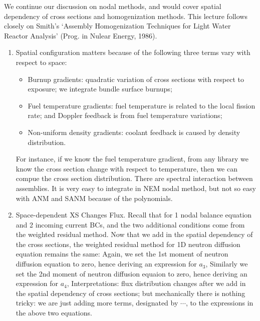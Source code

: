 \documentclass{school-22.211-notes}
\date{May  7, 2012}
\begin{document}
\maketitle

 \label{homogenization}
We continue our discussion on nodal methods, and would cover spatial dependency of cross sections and homogenization methods. This lecture follows closely on Smith's `Assembly Homogenization Techniques for Light Water Reactor Analysis' (Prog. in Nulear Energy, 1986). 




\begin{enumerate}
\item Spatial configuration matters because of the following three terms vary with respect to space:
\begin{itemize}
\item Burnup gradients: quadratic variation of cross sections with respect to exposure; we integrate bundle surface burnups;
\item Fuel temperature gradients: fuel temperature is related to the local fission rate; and Doppler feedback is from fuel temperature variations;
\item Non-uniform density gradients: coolant feedback is caused by density distribution.
\end{itemize}
For instance, if we know the fuel temperature gradient, from any library we know the cross section change with respect to temperature, then we can compue the cross section distribution.  There are spectral interaction between assemblies. It is very easy to integrate in NEM nodal method, but not so easy with ANM and SANM because of the polynomials. 

\item Space-dependent XS Changes Flux. Recall that for 1 nodal balance equation and 2 incoming current BCs, and the two additional conditions come from the weighted residual method. Now that we add in the spatial dependency of the cross sections, the weighted residual method for 1D neutron diffusion equation remains the same: 
Again, we set the 1st moment of neutron diffusion equation to zero, hence deriving an expression for $a_3$, 
Similarly we set the 2nd moment of neutron diffusion equaion to zero, hence deriving an expression for $a_4$, 
Interpretations: flux distribution changes after we add in the spatial dependency of cross sections; but mechanically there is nothing tricky: we are just adding more terms, designated by $\cdots$, to the expressions in the above two equations. 


\end{enumerate}
\end{document}
